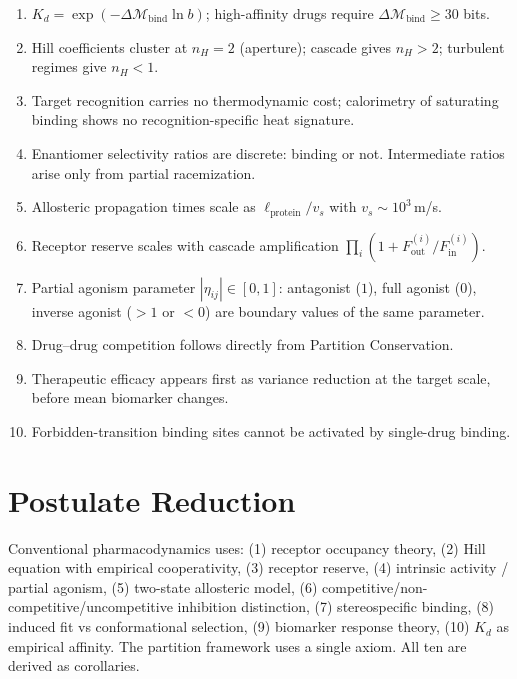 \documentclass[twocolumn,10pt,a4paper]{article}
\theoremstyle{definition}
\theoremstyle{remark}
\newcommand{\Depth}{\mathcal{M}}
\begin{document}
\begin{enumerate}[leftmargin=*,itemsep=2pt]
    \item $K_d = \exp(-\Delta\Depth_{\mathrm{bind}}\ln b)$; high-affinity drugs require $\Delta\Depth_{\mathrm{bind}}\geq 30$ bits.
    \item Hill coefficients cluster at $n_H = 2$ (aperture); cascade gives $n_H > 2$; turbulent regimes give $n_H < 1$.
    \item Target recognition carries no thermodynamic cost; calorimetry of saturating binding shows no recognition-specific heat signature.
    \item Enantiomer selectivity ratios are discrete: binding or not. Intermediate ratios arise only from partial racemization.
    \item Allosteric propagation times scale as $\ell_{\mathrm{protein}}/v_s$ with $v_s \sim 10^3$\,m/s.
    \item Receptor reserve scales with cascade amplification $\prod_i(1+F_{\mathrm{out}}^{(i)}/F_{\mathrm{in}}^{(i)})$.
    \item Partial agonism parameter $|\eta_{ij}|\in[0,1]$: antagonist ($1$), full agonist ($0$), inverse agonist ($>1$ or $<0$) are boundary values of the same parameter.
    \item Drug--drug competition follows directly from Partition Conservation.
    \item Therapeutic efficacy appears first as variance reduction at the target scale, before mean biomarker changes.
    \item Forbidden-transition binding sites cannot be activated by single-drug binding.
\end{enumerate}

\section{Postulate Reduction}

Conventional pharmacodynamics uses: (1) receptor occupancy theory, (2) Hill equation with empirical cooperativity, (3) receptor reserve, (4) intrinsic activity / partial agonism, (5) two-state allosteric model, (6) competitive/non-competitive/uncompetitive inhibition distinction, (7) stereospecific binding, (8) induced fit vs conformational selection, (9) biomarker response theory, (10) $K_d$ as empirical affinity. The partition framework uses a single axiom. All ten are derived as corollaries.
\end{document}

